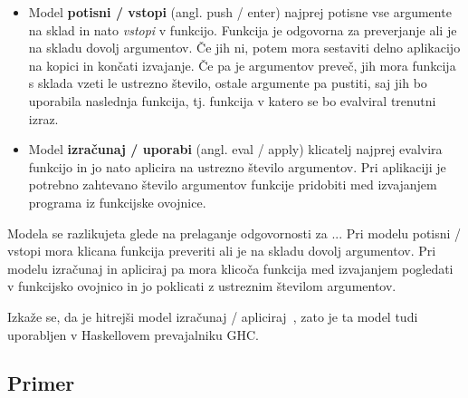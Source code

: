 
%
\begin{itemize}
	\itemsep 0em
	\item Model \textbf{potisni / vstopi} (angl. push / enter) najprej potisne vse argumente na sklad in nato \textit{vstopi} v funkcijo. Funkcija je odgovorna za preverjanje ali je na skladu dovolj argumentov. Če jih ni, potem mora sestaviti delno aplikacijo na kopici in končati izvajanje. Če pa je argumentov preveč, jih mora funkcija s sklada vzeti le ustrezno število, ostale argumente pa pustiti, saj jih bo uporabila naslednja funkcija, tj. funkcija v katero se bo evalviral trenutni izraz.
	\item Model \textbf{izračunaj / uporabi} (angl. eval / apply) klicatelj najprej evalvira funkcijo in jo nato aplicira na ustrezno število argumentov. Pri aplikaciji je potrebno zahtevano število argumentov funkcije pridobiti med izvajanjem programa iz funkcijske ovojnice.
\end{itemize}

Modela se razlikujeta glede na prelaganje odgovornosti za ... Pri modelu potisni / vstopi mora klicana funkcija preveriti ali je na skladu dovolj argumentov. Pri modelu izračunaj in apliciraj pa mora klicoča funkcija med izvajanjem pogledati v funkcijsko ovojnico in jo poklicati z ustreznim številom argumentov.


Izkaže se, da je hitrejši model izračunaj / apliciraj~\cite{marlow2004making}, zato je ta model tudi uporabljen v Haskellovem prevajalniku GHC.


\subsection{Primer}
